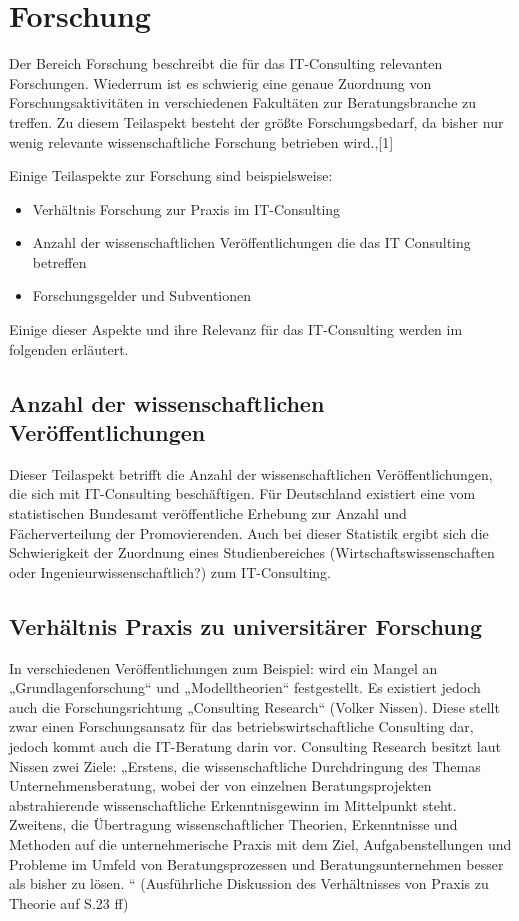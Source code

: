 \section{Forschung}
Der Bereich Forschung beschreibt die für das IT-Consulting relevanten Forschungen. Wiederrum ist es schwierig eine genaue Zuordnung von Forschungsaktivitäten in verschiedenen Fakultäten zur Beratungsbranche zu treffen. Zu diesem Teilaspekt besteht der größte Forschungsbedarf, da bisher nur wenig relevante wissenschaftliche Forschung betrieben wird.\cite[10]{nissen2007consulting},\cite{IDSScheer}[1]

Einige Teilaspekte zur Forschung sind beispielsweise:
\begin{itemize}
\item Verhältnis Forschung zur Praxis im IT-Consulting
\item Anzahl der wissenschaftlichen Veröffentlichungen die das IT Consulting betreffen
\item Forschungsgelder und Subventionen
\end{itemize}

Einige dieser Aspekte und ihre Relevanz für das IT-Consulting werden im folgenden erläutert.

\subsection{Anzahl der wissenschaftlichen Veröffentlichungen}
Dieser Teilaspekt betrifft die Anzahl der wissenschaftlichen Veröffentlichungen, die sich mit IT-Consulting beschäftigen. 
Für Deutschland existiert eine vom statistischen Bundesamt veröffentliche Erhebung zur Anzahl und Fächerverteilung der Promovierenden.\cite{destatis}
Auch bei dieser Statistik ergibt sich die Schwierigkeit der Zuordnung eines Studienbereiches (Wirtschaftswissenschaften oder Ingenieurwissenschaftlich?) zum IT-Consulting. 

\subsection{Verhältnis Praxis zu universitärer Forschung}
In verschiedenen Veröffentlichungen zum Beispiel: \cite[1]{IDSScheer} wird ein Mangel an „Grundlagenforschung“ und „Modelltheorien“ festgestellt. Es existiert jedoch auch die Forschungsrichtung „Consulting Research“ (Volker Nissen). Diese stellt zwar einen Forschungsansatz für das betriebswirtschaftliche Consulting dar, jedoch kommt auch die IT-Beratung darin vor. Consulting Research besitzt laut Nissen zwei Ziele: „Erstens, die wissenschaftliche Durchdringung des Themas Unternehmensberatung, wobei der von einzelnen Beratungsprojekten abstrahierende wissenschaftliche Erkenntnisgewinn im Mittelpunkt steht. Zweitens, die Übertragung wissenschaftlicher Theorien, Erkenntnisse und Methoden auf die unternehmerische Praxis mit dem Ziel, Aufgabenstellungen und Probleme im Umfeld von Beratungsprozessen und Beratungsunternehmen besser als bisher zu lösen. “
(Ausführliche Diskussion des Verhältnisses von Praxis zu Theorie auf S.23 ff)

